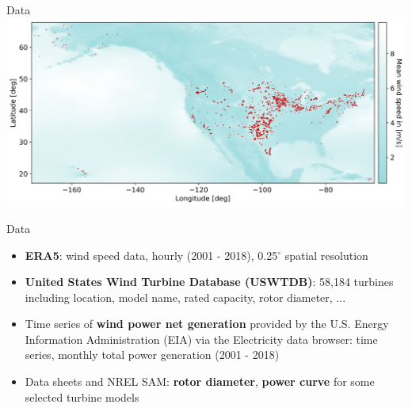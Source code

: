 \documentclass[color=usenames,dvipsnames]{beamer}
\begin{document}
    \begin{frame}{Data}
        \includegraphics[width=\textwidth]{../../figures/mean_wind_speed_and_turbines.png}
    \end{frame}

    \begin{frame}{Data}
        \begin{itemize}
            \item \textbf{ERA5}: wind speed data, hourly (2001 - 2018),
                0.25$^\circ$ spatial resolution\pause
            \item \textbf{United States Wind Turbine Database (USWTDB)}:
                58,184 turbines including location, model name, rated capacity,
                rotor diameter, ...\pause
            \item Time series of \textbf{wind power net generation} provided by
                the U.S. Energy Information Administration (EIA) via the
                Electricity data browser: time series, monthly total power
                generation (2001 - 2018)\pause
            \item Data sheets and NREL SAM:
                \textbf{rotor diameter}, \textbf{power curve} for some selected turbine models
        \end{itemize}
    \end{frame}
\end{document}
